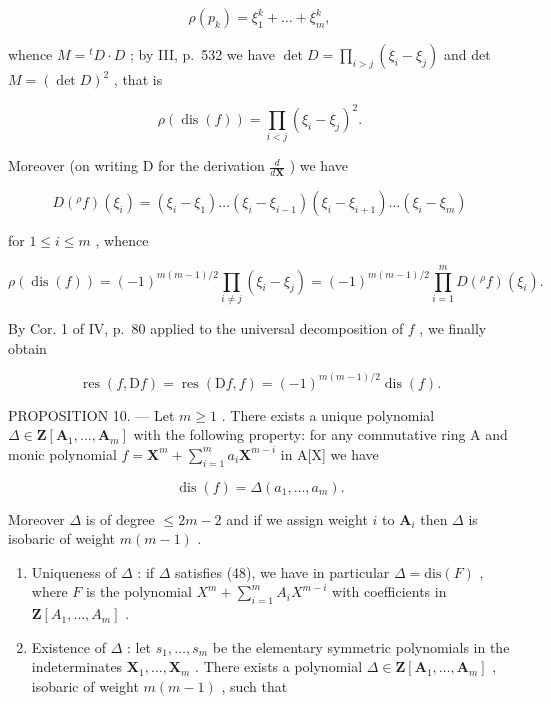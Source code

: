 \[
\rho (p _ {k}) = \xi_ {1} ^ {k} + \dots + \xi_ {m} ^ {k},
\]

whence \(M = {}^t D \cdot D\) ; by III, p.~532 we have \(\det D = \prod_{i > j} (\xi_i - \xi_j)\) and det \(M = (\det D)^2\) , that is

\[
\rho (\operatorname{dis} (f)) = \prod_ {i <   j} \left(\xi_ {i} - \xi_ {j}\right) ^ {2}.\tag{46}
\]

Moreover (on writing D for the derivation \(\frac{d}{d\mathbf{X}}\) ) we have

\[
D (^ {\rho} f) (\xi_ {i}) = (\xi_ {i} - \xi_ {1}) \dots (\xi_ {i} - \xi_ {i - 1}) (\xi_ {i} - \xi_ {i + 1}) \dots (\xi_ {i} - \xi_ {m})
\]

for \(1 \leqslant i \leqslant m\) , whence

\[
\rho (\operatorname{dis} (f)) = (- 1) ^ {m (m - 1) / 2} \prod_ {i \neq j} (\xi_ {i} - \xi_ {j}) = (- 1) ^ {m (m - 1) / 2} \prod_ {i = 1} ^ {m} D (^ {\rho} f) (\xi_ {i}).
\]

By Cor. 1 of IV, p.~80 applied to the universal decomposition of \(f\) , we finally obtain

\[
\operatorname{res} (f, \mathrm{D} f) = \operatorname{res} (\mathrm{D} f, f) = (- 1) ^ {m (m - 1) / 2} \operatorname{dis} (f).\tag{47}
\]

PROPOSITION 10. --- Let \(m \geqslant 1\) . There exists a unique polynomial \(\Delta \in \mathbf{Z}[\mathbf{A}_1, \ldots, \mathbf{A}_m]\) with the following property: for any commutative ring A and monic polynomial \(f = \mathbf{X}^m + \sum_{i=1}^{m} a_i \mathbf{X}^{m-i}\) in A{[}X{]} we have

\[
\operatorname{dis} (f) = \Delta \left(a _ {1}, \dots , a _ {m}\right).\tag{48}
\]

Moreover \(\Delta\) is of degree \(\leqslant 2m - 2\) and if we assign weight \(i\) to \(\mathbf{A}_i\) then \(\Delta\) is isobaric of weight \(m(m - 1)\) .

\begin{enumerate}
\def\labelenumi{\alph{enumi})}
\item
  Uniqueness of \(\Delta\) : if \(\Delta\) satisfies (48), we have in particular \(\Delta = \text{dis}(F)\) , where \(F\) is the polynomial \(X^{m} + \sum_{i=1}^{m} A_{i} X^{m-i}\) with coefficients in \(\mathbf{Z}[A_{1}, \ldots, A_{m}]\) .
\item
  Existence of \(\Delta\) : let \(s_1, \ldots, s_m\) be the elementary symmetric polynomials in the indeterminates \(\mathbf{X}_1, \ldots, \mathbf{X}_m\) . There exists a polynomial \(\Delta \in \mathbf{Z}[\mathbf{A}_1, \ldots, \mathbf{A}_m]\) , isobaric of weight \(m(m-1)\) , such that
\end{enumerate}

